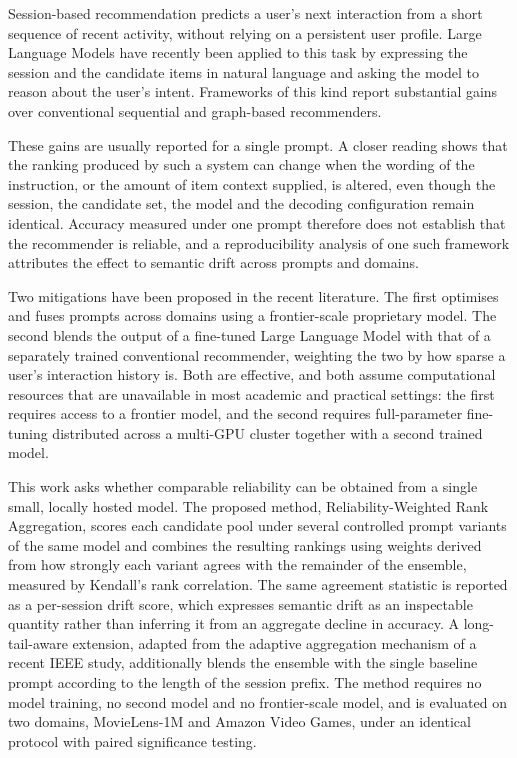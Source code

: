 \documentclass[12pt,a4paper,oneside]{report}
\begin{document}
Session-based recommendation predicts a user's next interaction from a short
sequence of recent activity, without relying on a persistent user profile.
Large Language Models have recently been applied to this task by expressing the
session and the candidate items in natural language and asking the model to
reason about the user's intent. Frameworks of this kind report substantial gains
over conventional sequential and graph-based recommenders.

These gains are usually reported for a single prompt. A closer reading shows
that the ranking produced by such a system can change when the wording of the
instruction, or the amount of item context supplied, is altered, even though the
session, the candidate set, the model and the decoding configuration remain
identical. Accuracy measured under one prompt therefore does not establish that
the recommender is reliable, and a reproducibility analysis of one such
framework attributes the effect to semantic drift across prompts and domains.

Two mitigations have been proposed in the recent literature. The first optimises
and fuses prompts across domains using a frontier-scale proprietary model. The
second blends the output of a fine-tuned Large Language Model with that of a
separately trained conventional recommender, weighting the two by how sparse a
user's interaction history is. Both are effective, and both assume computational
resources that are unavailable in most academic and practical settings: the
first requires access to a frontier model, and the second requires full-parameter
fine-tuning distributed across a multi-GPU cluster together with a second trained
model.

This work asks whether comparable reliability can be obtained from a single
small, locally hosted model. The proposed method, Reliability-Weighted Rank
Aggregation, scores each candidate pool under several controlled prompt variants
of the same model and combines the resulting rankings using weights derived from
how strongly each variant agrees with the remainder of the ensemble, measured by
Kendall's rank correlation. The same agreement statistic is reported as a
per-session drift score, which expresses semantic drift as an inspectable
quantity rather than inferring it from an aggregate decline in accuracy. A
long-tail-aware extension, adapted from the adaptive aggregation mechanism of a
recent IEEE study, additionally blends the ensemble with the single baseline
prompt according to the length of the session prefix. The method requires no
model training, no second model and no frontier-scale model, and is evaluated on
two domains, MovieLens-1M and Amazon Video Games, under an identical protocol
with paired significance testing.
\end{document}
